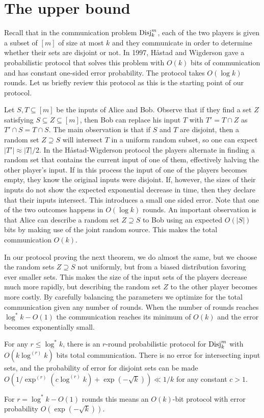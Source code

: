 \section{The upper bound}
\label{sec:upperbound}
Recall that in the communication problem $\operatorname{Disj}_k^m$, each of
the two players is given a subset of $[m]$ of size at most $k$
and they communicate in order to determine whether their sets
are disjoint or not. In 1997, H\aa stad and Wigderson
\cite{ParnafesIRWA1997,HastadW2007} gave a probabilistic protocol
that solves this problem with $O(k)$ bits of communication and
has constant one-sided error probability. The protocol takes
$O(\log k)$ rounds. Let us briefly review this protocol as this
is the starting point of our protocol.

Let $S,T\subseteq[m]$ be the inputs of Alice and Bob. Observe
that if they find a set $Z$ satisfying $S\subseteq Z\subseteq
[m]$, then Bob can replace his input $T$ with $T'=T\cap Z$ as
$T'\cap S=T\cap S$. The main observation is that if $S$ and $T$
are disjoint, then a random set $Z\supseteq S$ will intersect
$T$ in a uniform random subset, so one can expect
$|T'|\approx|T|/2$. In the H\aa stad-Wigderson protocol the
players alternate in finding a random set that contains the
current input of one of them, effectively halving the other
player's input. If in this process the input of one of the
players becomes empty, they know the original inputs were
disjoint. If, however, the sizes of their inputs do not show the
expected exponential decrease in time, then they declare that
their inputs intersect. This introduces a small one sided error.
Note that one of the two outcomes happens in $O(\log k)$ rounds.
An important observation is that Alice can describe a random set
$Z\supseteq S$ to Bob using an expected $O(|S|)$ bits by making
use of the joint random source. This makes the total
communication $O(k)$.

In our protocol proving the next theorem, we do almost the same,
but we choose the random sets $Z\supseteq S$ not uniformly, but
from a biased distribution favoring ever smaller sets. This
makes the size of the input sets of the players decrease much
more rapidly, but describing the random set $Z$ to the other
player becomes more costly. By carefully balancing the
parameters we optimize for the total communication given any
number of rounds. When the number of rounds reaches
$\log^*k-O(1)$ the communication reaches its minimum of $O(k)$
and the error becomes exponentially small.

\begin{theorem}\label{thm:ub}
For any $r\leq \log^*k$, there is an $r$-round probabilistic
protocol for $\operatorname{Disj}^m_k$ with $O(k\log^{(r)}k)$ bits total
communication. There is no error for intersecting input sets,
and the probability of error for disjoint sets can be made
$O(1/\exp^{(r)}(c\log^{(r)} k)+ \exp(-\sqrt k))\ll 1/k$ for any
constant $c > 1$.

For $r=\log^*k-O(1)$ rounds this means an $O(k)$-bit protocol
with error probability $O(\exp(-\sqrt k))$.
\end{theorem}

